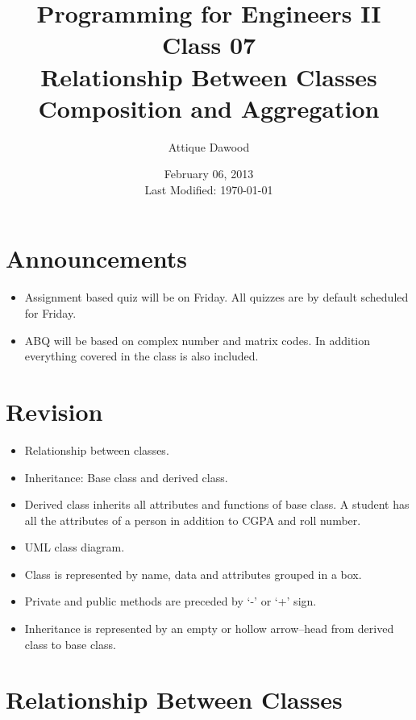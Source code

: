 \documentclass[12pt,a4paper]{article}
\title{\vspace{-2cm}Programming for Engineers II\\Class 07\\Relationship Between Classes\\Composition and Aggregation}
\author{Attique Dawood}
\date{February 06, 2013\\[0.2cm] Last Modified: \today}
\begin{document}
\maketitle
\section{Announcements}
\begin{itemize}
\item Assignment based quiz will be on Friday. All quizzes are by default scheduled for Friday.
\item ABQ will be based on complex number and matrix codes. In addition everything covered in the class is also included.
\end{itemize}
\section{Revision}
\begin{itemize}
\item Relationship between classes.
\item Inheritance: Base class and derived class.
\item Derived class inherits all attributes and functions of base class. A student has all the attributes of a person in addition to CGPA and roll number.
\item UML class diagram.
\item Class is represented by name, data and attributes grouped in a box.
\item Private and public methods are preceded by `-' or `+' sign.
\item Inheritance is represented by an empty or hollow arrow--head from derived class to base class.
\end{itemize}
\section{Relationship Between Classes}
\end{document}
